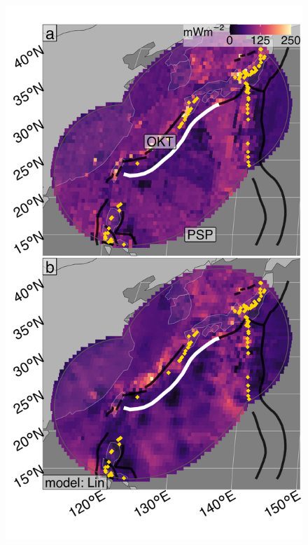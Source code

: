 \begin{figure}[htbp]

{\centering \includegraphics[width=1\linewidth,]{assets/figs/chpt3/KyushuRyukyuDiffComp} 

}


\end{figure}
